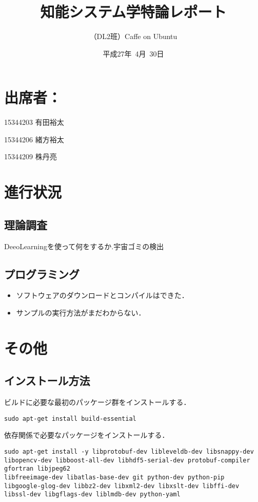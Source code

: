 \documentclass[a4paper,10pt]{jsarticle}
\title{知能システム学特論レポート}
\author{
（DL2班）Caffe on Ubuntu\\
}
\date{平成27年\ 4月\ 30日}
\begin{document}
\maketitle
\section{出席者：}
\begin{list}%
 {} %
 {} %
 \item 15344203 有田裕太
 \item 15344206 緒方裕太
 \item 15344209 株丹亮
\end{list}
\section{進行状況}
\subsection{理論調査}
DeeoLearningを使って何をするか.宇宙ゴミの検出

\subsection{プログラミング}
\begin{itemize}
 \item ソフトウェアのダウンロードとコンパイルはできた．
 \item サンプルの実行方法がまだわからない．
\end{itemize}

\section{その他}
\subsection{インストール方法}

ビルドに必要な最初のパッケージ群をインストールする．
\begin{lstlisting}[basicstyle=\ttfamily\footnotesize, frame=single]
sudo apt-get install build-essential
\end{lstlisting}

依存関係で必要なパッケージをインストールする．
\begin{lstlisting}[basicstyle=\ttfamily\footnotesize, frame=single]
sudo apt-get install -y libprotobuf-dev libleveldb-dev libsnappy-dev
libopencv-dev libboost-all-dev libhdf5-serial-dev protobuf-compiler gfortran libjpeg62
libfreeimage-dev libatlas-base-dev git python-dev python-pip
libgoogle-glog-dev libbz2-dev libxml2-dev libxslt-dev libffi-dev
libssl-dev libgflags-dev liblmdb-dev python-yaml
\end{lstlisting}
\end{document}
